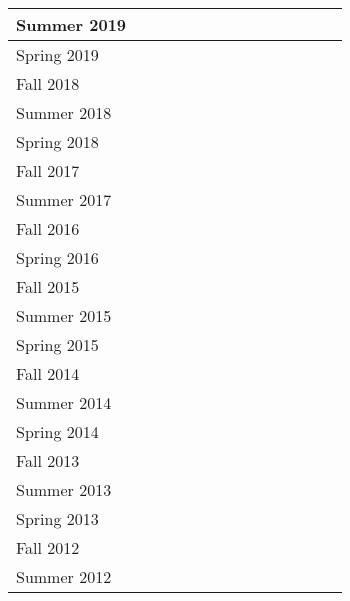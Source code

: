 \documentclass[11pt]{letter}
\newcommand{\ck}{\checkmark}
\begin{document}
\begin{tabular}{|l|c|c|c|c|c|c|c|c|c|c|c|c|c|}
  Summer 2019 &    &    &    &    &    &\ck &    &    &    &    &    &    &    \\ \hline
  Spring 2019 &    &    &    &    &    &\ck &    &    &    &\ck &\ck &    &    \\ \hline
  Fall   2018 &\ck &    &    &    &\ck &\ck &    &    &    &    &    &    &    \\ \hline
  Summer 2018 &    &    &    &    &    &\ck &    &    &    &    &    &    &    \\ \hline
  Spring 2018 &    &    &    &    &    &\ck &    &    &    &\ck &    &    &    \\ \hline
  Fall   2017 &    &    &    &    &\ck &\ck &    &    &    &    &    &    &    \\ \hline
  Summer 2017 &    &    &    &    &    &    &    &\ck &    &    &    &    &    \\ \hline
  Fall   2016 &    &\ck &    &    &    &    &\ck &    &    &    &    &    &    \\ \hline
  Spring 2016 &    &\ck &    &    &    &    &    &    &    &\ck &    &    &    \\ \hline
  Fall   2015 &    &\ck &    &    &    &    &\ck &    &    &    &    &    &    \\ \hline
  Summer 2015 &    &    &    &    &    &\ck &    &    &    &    &    &    &    \\ \hline
  Spring 2015 &    &    &\ck &    &    &\ck &    &    &    &    &    &    &    \\ \hline
  Fall   2014 &    &    &    &    &    &\ck &\ck &    &    &    &    &    &    \\ \hline
  Summer 2014 &    &    &    &    &    &\ck &    &    &    &    &    &    &    \\ \hline
  Spring 2014 &    &    &    &    &    &\ck &    &    &    &    &    &    &    \\ \hline
  Fall   2013 &    &\ck &    &    &    &    &    &    &\ck &    &    &    &    \\ \hline
  Summer 2013 &    &    &    &    &    &\ck &    &    &    &    &    &    &    \\ \hline
  Spring 2013 &    &\ck &    &    &    &\ck &    &    &    &    &    &    &    \\ \hline
  Fall   2012 &\ck &    &    &    &    &    &    &    &    &    &    &    &    \\ \hline
  Summer 2012 &    &    &    &    &    &\ck &    &\ck &    &    &    &    &    \\ \hline

\end{tabular}
\end{document}
